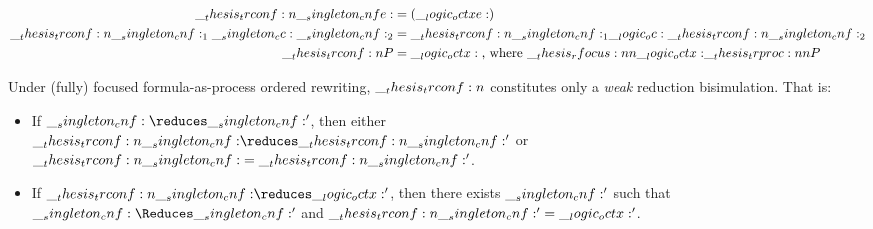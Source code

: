 \begin{equation*}
  \begin{aligned}
    \trconf{\cnfe} &= (\octxe) \\
    \trconf{\cnf_1 \cc \cnf_2} &= \trconf{\cnf_1} \oc \trconf{\cnf_2} \\
    \trconf{P} &= \octx \text{, where $\rfocus{\octx}{\trproc{P}}$}
  \end{aligned}
\end{equation*}

\begin{theorem}
  Under (fully) focused formula-as-process ordered rewriting, $\__thesis_trconf:n {}$ constitutes only a \emph{weak} reduction bisimulation.
  That is:
  \begin{itemize}[nosep]
  \item If $\cnf \reduces \cnf'$, then either $\trconf{\cnf} \reduces \trconf{\cnf'}$ or $\__thesis_trconf:n {\__singleton_cnf:} = \__thesis_trconf:n {\__singleton_cnf:'}$.
  \item If $\trconf{\cnf} \reduces \octx'$, then there exists $\__singleton_cnf:'$ such that $\cnf \Reduces \cnf'$ and $\__thesis_trconf:n {\__singleton_cnf:'} = \__logic_octx:'$.
  \end{itemize}
\end{theorem}




